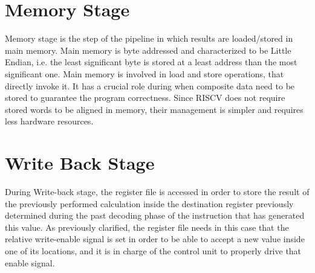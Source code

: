 \section{Memory Stage}

Memory stage is the step of the pipeline in which results are loaded/stored in main memory.
Main memory is byte addressed and characterized to be Little Endian, i.e. the least significant byte is stored at a least address than the most significant one.
Main memory is involved in load and store operations, that directly invoke it. It has a crucial role during when composite data need to be stored to guarantee the program correctness.
Since RISCV does not require stored words to be aligned in memory, their management is simpler and requires less hardware resources.

\section{Write Back Stage}

During Write-back stage, the register file is accessed in order to store the result of the previously performed calculation inside the destination register previously determined during the past decoding phase of the instruction that has generated this value.
As previously clarified, the register file needs in this case that the relative write-enable signal is set in order to be able to accept a new value inside one of its locations, and it is in charge of the control unit to properly drive that enable signal.